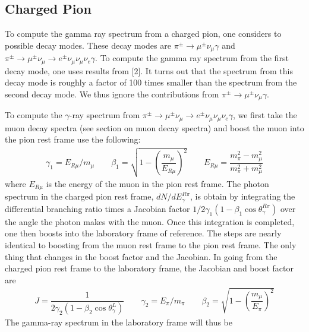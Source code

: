 \documentclass[letterpaper,10pt,english]{sphinxmanual}
\begin{document}
\subsection{Charged Pion}
\label{\detokenize{Description:charged-pion}}
To compute the gamma ray spectrum from a charged pion, one considers to possible decay modes. These decay modes are \(\pi^{\pm} \to \mu^{\pm}\nu_{\mu}\gamma\) and \(\pi^{\pm} \to \mu^{\pm}\nu_{\mu} \to e^{\pm}\nu_{\mu}\nu_{\mu}\nu_{e}\gamma\). To compute the gamma ray spectrum from the first decay mode, one uses results from {[}2{]}. It turns out that the spectrum from this decay mode is roughly a factor of 100 times smaller than the spectrum from the second decay mode. We thus ignore the contributions from \(\pi^{\pm} \to \mu^{\pm}\nu_{\mu}\gamma\).

To compute the \(\gamma\)-ray spectrum from \(\pi^{\pm} \to \mu^{\pm}\nu_{\mu} \to e^{\pm}\nu_{\mu}\nu_{\mu}\nu_{e}\gamma\), we first take the muon decay spectra (see section on muon decay spectra) and boost the muon into the pion rest frame use the following:
\begin{equation*}
\begin{split}\gamma_{1} = E_{R\mu}/m_{\mu} \qquad
\beta_{1} = \sqrt{1-\left(\dfrac{m_{\mu}}{E_{R\mu}}\right)^2} \qquad  E_{R\mu} = \dfrac{m_{\pi}^2 - m_{\mu}^2}{m_{\pi}^2 + m_{\mu}^2}\end{split}
\end{equation*}
where \(E_{R\mu}\) is the energy of the muon in the pion rest frame. The photon spectrum in the charged pion rest frame, \(dN/dE_{\gamma}^{R\pi}\), is obtain by integrating the differential branching ratio times a Jacobian factor \(1/2\gamma_{1}(1-\beta_{1}\cos\theta_{\gamma}^{R\pi})\) over the
angle the photon makes with the muon. Once this integration is completed, one then boosts into the laboratory frame of reference. The steps are nearly identical to boosting from the muon rest frame to the pion rest frame. The only thing that changes in the boost factor and the Jacobian. In going from the charged pion rest frame to the laboratory frame, the Jacobian and boost factor are
\begin{equation*}
\begin{split}J = \dfrac{1}{2\gamma_{2}(1-\beta_{2}\cos\theta_{\gamma}^{L})} \qquad
\gamma_{2} = E_{\pi} / m_{\pi} \qquad
\beta_{2} = \sqrt{1 - \left(\dfrac{m_{\mu}}{E_{\pi}}\right)^2}\end{split}
\end{equation*}
The gamma-ray spectrum in the laboratory frame will thus be
\end{document}
